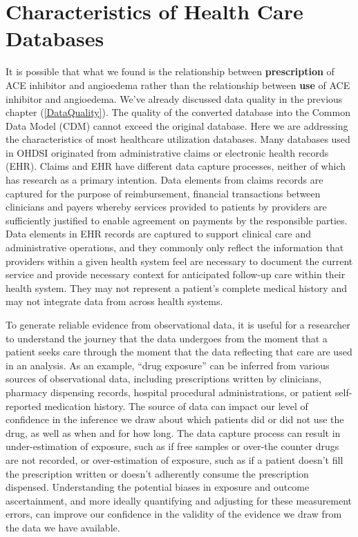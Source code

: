 \documentclass[11pt]{book}
\theoremstyle{definition}
\theoremstyle{definition}
\theoremstyle{definition}
\theoremstyle{remark}
\begin{document}
\section{Characteristics of Health Care
Databases}\label{CharacteristicsOfDatabase}

It is possible that what we found is the relationship between
\textbf{prescription} of ACE inhibitor and angioedema rather than the
relationship between \textbf{use} of ACE inhibitor and angioedema. We've
already discussed data quality in the previous chapter
(\ref{DataQuality}). The quality of the converted database into the
Common Data Model (CDM) cannot exceed the original database. Here we are
addressing the characteristics of most healthcare utilization databases.
Many databases used in OHDSI originated from administrative claims or
electronic health records (EHR). Claims and EHR have different data
capture processes, neither of which has research as a primary intention.
Data elements from claims records are captured for the purpose of
reimbursement, financial transactions between clinicians and payers
whereby services provided to patients by providers are sufficiently
justified to enable agreement on payments by the responsible parties.
Data elements in EHR records are captured to support clinical care and
administrative operations, and they commonly only reflect the
information that providers within a given health system feel are
necessary to document the current service and provide necessary context
for anticipated follow-up care within their health system. They may not
represent a patient's complete medical history and may not integrate
data from across health systems.

To generate reliable evidence from observational data, it is useful for
a researcher to understand the journey that the data undergoes from the
moment that a patient seeks care through the moment that the data
reflecting that care are used in an analysis. As an example, ``drug
exposure'' can be inferred from various sources of observational data,
including prescriptions written by clinicians, pharmacy dispensing
records, hospital procedural administrations, or patient self-reported
medication history. The source of data can impact our level of
confidence in the inference we draw about which patients did or did not
use the drug, as well as when and for how long. The data capture process
can result in under-estimation of exposure, such as if free samples or
over-the counter drugs are not recorded, or over-estimation of exposure,
such as if a patient doesn't fill the prescription written or doesn't
adherently consume the prescription dispensed. Understanding the
potential biases in exposure and outcome ascertainment, and more ideally
quantifying and adjusting for these measurement errors, can improve our
confidence in the validity of the evidence we draw from the data we have
available.
\end{document}
